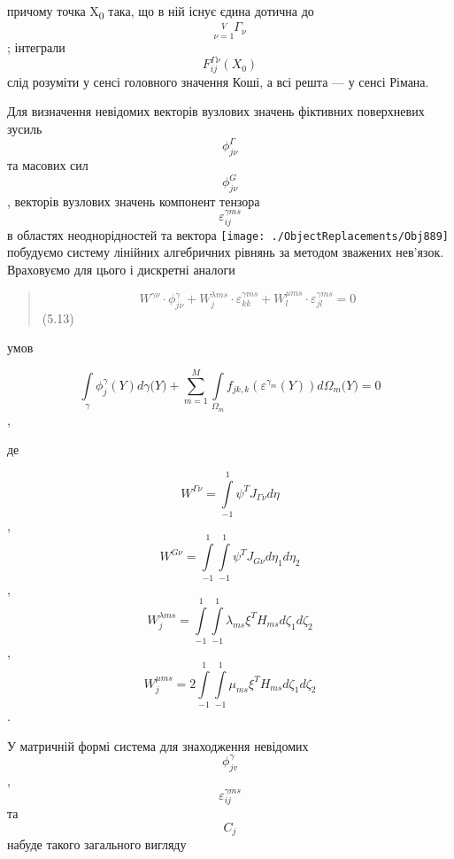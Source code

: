 причому точка X\textsubscript{0} така, що в ній існує єдина дотична до
\[{\underset{\nu = 1}{\overset{V}{}}\Gamma_{\nu}}{}\]; інтеграли
\[{F_{\mathit{\text{ij}}}^{\mathit{\Gamma\nu}}(X_{0})}{}\] слід розуміти
у сенсі головного значення Коші, а всі решта --- у сенсі Рімана.

Для визначення невідомих векторів вузлових значень фіктивних поверхневих
зусиль \[\phi_{\mathit{j\nu}}^{\Gamma}{}\] та масових сил
\[\phi_{\mathit{j\nu}}^{G}{}\], векторів вузлових значень компонент
тензора
\[\varepsilon_{\mathit{\text{ij}}}^{\gamma\mathit{\text{ms}}}{}\] в
областях неоднорідностей та вектора
\texttt{[image: ./ObjectReplacements/Obj889]}
побудуємо систему лінійних алгебричних рівнянь за методом зважених
нев'язок. Враховуємо для цього і дискретні аналоги

\begin{quote}
\[{{{W^{\mathit{\text{γν}}} \cdot \phi_{\mathit{j\nu}}^{\gamma}} + {W_{j}^{\lambda\mathit{\text{ms}}} \cdot \varepsilon_{\mathit{\text{kk}}}^{\gamma\mathit{\text{ms}}}} + {W_{l}^{\mu\mathit{\text{ms}}} \cdot \varepsilon_{\mathit{\text{jl}}}^{\gamma\mathit{\text{ms}}}}} = 0}{}\]
(5.13)
\end{quote}

умов

\[{\int\limits_{\gamma}{\phi_{j}^{\gamma}(Y)\mathit{d\gamma}(Y{) + {\sum\limits_{m = 1}^{M}{\int\limits_{\Omega_{m}}{f_{\mathit{\text{jk}},k}(\varepsilon^{\gamma_{m}}(Y))d\Omega_{m}{(Y{) = 0}}}}}}}}{}\],

де

\[{W^{\mathit{\Gamma\nu}} = {\int\limits_{- 1}^{1}{\psi^{T}J_{\mathit{\Gamma\nu}}\mathit{d\eta}}}}{}\],
\[{W^{\mathit{G\nu}} = {\int\limits_{- 1}^{1}{\int\limits_{- 1}^{1}{\psi^{T}J_{\mathit{G\nu}}\mathit{d\eta}_{1}\mathit{d\eta}_{2}}}}}{}\],
\[{W_{j}^{\lambda\mathit{\text{ms}}} = {\int\limits_{- 1}^{1}{\int\limits_{- 1}^{1}{\lambda_{\mathit{\text{ms}}}\xi^{T}H_{\mathit{\text{ms}}}\mathit{d\zeta}_{1}\mathit{d\zeta}_{2}}}}}{}\],
\[{{W_{j}^{\mu\mathit{\text{ms}}} = 2}{\int\limits_{- 1}^{1}{\int\limits_{- 1}^{1}{\mu_{\mathit{\text{ms}}}\xi^{T}H_{\mathit{\text{ms}}}\mathit{d\zeta}_{1}\mathit{d\zeta}_{2}}}}}{}\].

У матричній формі система для знаходження невідомих
\[\phi_{\mathit{\text{jv}}}^{\gamma}{}\],
\[\varepsilon_{\mathit{\text{ij}}}^{\gamma\mathit{\text{ms}}}{}\] та
\[C_{j}{}\] набуде такого загального вигляду

